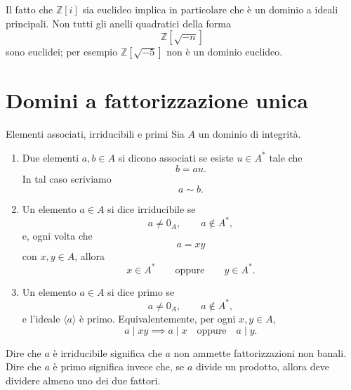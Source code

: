 \documentclass[a4paper]{article}
\begin{document}
\begin{radioactive}
\begin{snippetremark}{}
    Il fatto che \(\mathbb{Z}[i]\) sia euclideo implica in particolare che è un dominio a ideali principali.
    Non tutti gli anelli quadratici della forma
    \[
        \mathbb{Z}[\sqrt{-n}]
    \]
    sono euclidei; per esempio \(\mathbb{Z}[\sqrt{-5}]\) non è un dominio euclideo.
\end{snippetremark}
\end{radioactive}

\pagebreak

\section{Domini a fattorizzazione unica}

\begin{radioactive}
\begin{snippetdefinition}{Elementi associati, irriducibili e primi}
    Sia \(A\) un dominio di integrità.

    \begin{enumerate}
        \item Due elementi \(a,b\in A\) si dicono associati se esiste \(u\in A^\ast\) tale che
        \[
            b=au.
        \]
        In tal caso scriviamo
        \[
            a\sim b.
        \]

        \item Un elemento \(a\in A\) si dice irriducibile se
        \[
            a\neq 0_A,
            \qquad
            a\notin A^\ast,
        \]
        e, ogni volta che
        \[
            a=xy
        \]
        con \(x,y\in A\), allora
        \[
            x\in A^\ast
            \qquad
            \text{oppure}
            \qquad
            y\in A^\ast.
        \]

        \item Un elemento \(a\in A\) si dice primo se
        \[
            a\neq 0_A,
            \qquad
            a\notin A^\ast,
        \]
        e l'ideale \(\langle a \rangle\) è primo. Equivalentemente, per ogni \(x,y\in A\),
        \[
            a\mid xy
            \implies
            a\mid x
            \quad
            \text{oppure}
            \quad
            a\mid y.
        \]
    \end{enumerate}
\end{snippetdefinition}
\end{radioactive}

\begin{radioactive}
Dire che \(a\) è irriducibile significa che \(a\) non ammette fattorizzazioni non banali.
Dire che \(a\) è primo significa invece che, se \(a\) divide un prodotto, allora deve dividere almeno uno dei due fattori.
\end{radioactive}
\end{document}
